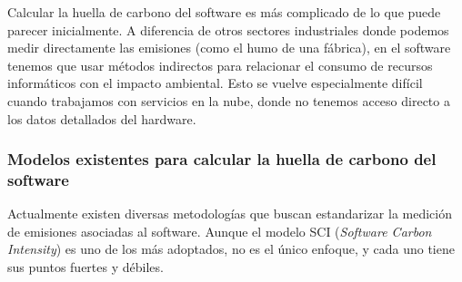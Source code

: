 \documentclass[12pt,a4paper]{report}
\begin{document}
Calcular la huella de carbono del software es más complicado de lo que puede parecer inicialmente. A diferencia de otros sectores industriales donde podemos medir directamente las emisiones (como el humo de una fábrica), en el software tenemos que usar métodos indirectos para relacionar el consumo de recursos informáticos con el impacto ambiental. Esto se vuelve especialmente difícil cuando trabajamos con servicios en la nube, donde no tenemos acceso directo a los datos detallados del hardware.

\subsubsection*{Modelos existentes para calcular la huella de carbono del software}

Actualmente existen diversas metodologías que buscan estandarizar la medición de emisiones asociadas al software. Aunque el modelo SCI (\textit{Software Carbon Intensity}) es uno de los más adoptados, no es el único enfoque, y cada uno tiene sus puntos fuertes y débiles.
\end{document}
